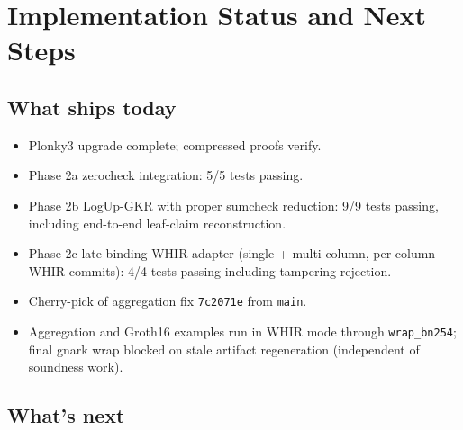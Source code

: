 \section{Implementation Status and Next Steps}
\label{sec:status-next}

\subsection{What ships today}

\begin{itemize}
  \item Plonky3 upgrade complete; compressed proofs verify.
  \item Phase 2a zerocheck integration: 5/5 tests passing.
  \item Phase 2b LogUp-GKR with proper sumcheck reduction: 9/9 tests
        passing, including end-to-end leaf-claim reconstruction.
  \item Phase 2c late-binding WHIR adapter (single + multi-column,
        per-column WHIR commits): 4/4 tests passing including
        tampering rejection.
  \item Cherry-pick of aggregation fix \texttt{7c2071e} from \texttt{main}.
  \item Aggregation and Groth16 examples run in WHIR mode through
        \texttt{wrap\_bn254}; final gnark wrap blocked on stale
        artifact regeneration (independent of soundness work).
\end{itemize}

\subsection{What's next}

